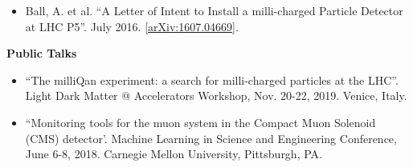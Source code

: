 \begin{vitae}
\begin{itemize}
\item Ball, A. et al. ``A Letter of Intent to Install a milli-charged Particle Detector at LHC P5''. July 2016.
  [\href{https://arxiv.org/abs/1607.04669}{arXiv:1607.04669}].

\end{itemize}


\vspace{0.2cm}
\textbf{Public Talks}

\begin{itemize}

\item ``The milliQan experiment: a search for milli-charged particles at the LHC''.
Light Dark Matter @ Accelerators Workshop, Nov. 20-22, 2019. Venice, Italy.

\item ``Monitoring tools for the muon system in the Compact Muon Solenoid (CMS) detector'.
Machine Learning in Science and Engineering Conference, June 6-8, 2018. Carnegie Mellon
University, Pittsburgh, PA.

\end{itemize}

\end{vitae}
